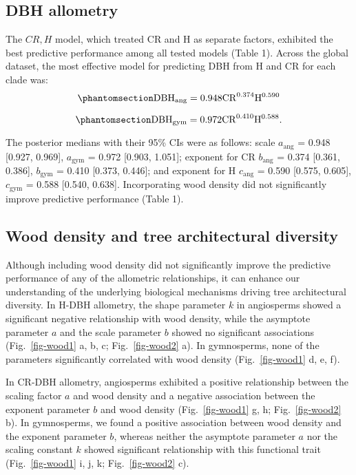 \documentclass[
  12pt,
  letterpaper,
  DIV=11,
  numbers=noendperiod]{scrartcl}
\begin{document}
\subsection{DBH allometry}\label{dbh-allometry}

The \(CR,H\) model, which treated CR and H as separate factors,
exhibited the best predictive performance among all tested models (Table
1). Across the global dataset, the most effective model for predicting
DBH from H and CR for each clade was:
\begin{equation}\phantomsection\label{eq-dbh_ang}{
\mathrm{DBH_{ang}} = \mathrm{0.948}
\mathrm{CR}^{\text{0.374}}
\mathrm{H}^{\text{0.590}}
}\end{equation}

\begin{equation}\phantomsection\label{eq-dbh_gym}{
\mathrm{DBH_{gym}} = \mathrm{0.972}
\mathrm{CR}^{\text{0.410}}
\mathrm{H}^{\text{0.588}}.
}\end{equation}

The posterior medians with their 95\% CIs were as follows: scale
\(a_{\text{ang}}\) = 0.948 {[}0.927, 0.969{]}, \(a_{\text{gym}}\) =
0.972 {[}0.903, 1.051{]}; exponent for CR \(b_{\text{ang}}\) = 0.374
{[}0.361, 0.386{]}, \(b_{\text{gym}}\) = 0.410 {[}0.373, 0.446{]}; and
exponent for H \(c_{\text{ang}}\) = 0.590 {[}0.575, 0.605{]},
\(c_{\text{gym}}\) = 0.588 {[}0.540, 0.638{]}. Incorporating wood
density did not significantly improve predictive performance (Table 1).

\subsection{Wood density and tree architectural
diversity}\label{wood-density-and-tree-architectural-diversity}

Although including wood density did not significantly improve the
predictive performance of any of the allometric relationships, it can
enhance our understanding of the underlying biological mechanisms
driving tree architectural diversity. In H-DBH allometry, the shape
parameter \(k\) in angiosperms showed a significant negative
relationship with wood density, while the asymptote parameter \(a\) and
the scale parameter \(b\) showed no significant associations
(Fig.~\ref{fig-wood1} a, b, c; Fig.~\ref{fig-wood2} a). In gymnosperms,
none of the parameters significantly correlated with wood density
(Fig.~\ref{fig-wood1} d, e, f).

In CR-DBH allometry, angiosperms exhibited a positive relationship
between the scaling factor \(a\) and wood density and a negative
association between the exponent parameter \(b\) and wood density
(Fig.~\ref{fig-wood1} g, h; Fig.~\ref{fig-wood2} b). In gymnosperms, we
found a positive association between wood density and the exponent
parameter \(b\), whereas neither the asymptote parameter \(a\) nor the
scaling constant \(k\) showed significant relationship with this
functional trait (Fig.~\ref{fig-wood1} i, j, k; Fig.~\ref{fig-wood2} c).
\end{document}
